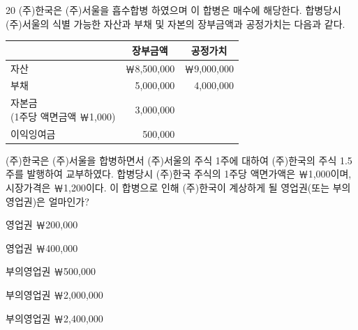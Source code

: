 \begin{question}{20}
(주)한국은 (주)서울을 흡수합병 하였으며 이 합병은 매수에 해당한다. 합병당시 (주)서울의 식별 가능한 자산과 부채 및 자본의 장부금액과 공정가치는 다음과 같다.

{\small\centering
\begin{tabular}{l r r}
\hline
 & \multicolumn{1}{c}{장부금액} & \multicolumn{1}{c}{공정가치} \\
\hline
자산 & ￦8,500,000 & ￦9,000,000 \\
부채 & 5,000,000 & 4,000,000 \\
\makecell[l]{자본금\\(1주당 액면금액 ￦1,000)} & 3,000,000 & \\
이익잉여금 & 500,000 & \\
\hline
\end{tabular}\par}
(주)한국은 (주)서울을 합병하면서 (주)서울의 주식 1주에 대하여 (주)한국의 주식 1.5주를 발행하여 교부하였다. 합병당시 (주)한국 주식의 1주당 액면가액은 ￦1,000이며, 시장가격은 ￦1,200이다. 이 합병으로 인해 (주)한국이 계상하게 될 영업권(또는 부의영업권)은 얼마인가? \par
\begin{choices}
  \item 영업권 ￦200,000
  \item 영업권 ￦400,000
  \item 부의영업권 ￦500,000
  \item 부의영업권 ￦2,000,000
  \item 부의영업권 ￦2,400,000
\end{choices}
\end{question}
